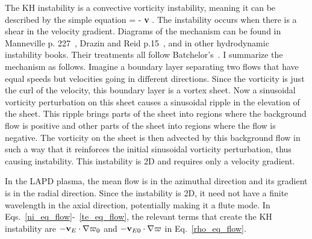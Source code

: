 The KH instability is a convective vorticity instability, meaning it can be described by the simple equation
\beq
\label{kh_inst_eq}
 = - {\bf v} \cdot \grad \varpi.
\eeq
The instability occurs when there is a shear in the velocity gradient. Diagrams of the mechanism can be found in Manneville p. 227~\cite{manneville2004}, Drazin and Reid p.15~\cite{drazin1981},
and in other hydrodynamic instability books. Their treatments all follow Batchelor's~\cite{batchelor1967}. I summarize the mechanism as follows.
Imagine a boundary layer separating two flows that have equal speeds but velocities going in different directions. Since
the vorticity is just the curl of the velocity, this boundary layer is a vortex sheet. Now a sinusoidal vorticity perturbation on this sheet causes a sinusoidal ripple in the elevation
of the sheet. This ripple brings parts of the sheet into regions where the background flow is positive and other parts of the sheet into regions where the flow is negative. The vorticity on
the sheet is then advected by this background flow in such a way that it reinforces the initial sinusoidal vorticity perturbation, thus causing instability. This instability is 2D and requires
only a velocity gradient.

In the LAPD plasma, the mean flow is in the azimuthal direction and its gradient is in the radial direction. Since the instability is 2D, it need not have a finite wavelength in the axial direction,
potentially making it a flute mode. In Eqs.~\ref{ni_eq_flow}-~\ref{te_eq_flow}, the relevant terms that create the KH instability are 
$- {\mathbf v_E} \cdot \nabla \varpi_0$ and $- {\mathbf v_{E0}} \cdot \nabla \varpi$ in Eq.~\ref{rho_eq_flow}.

